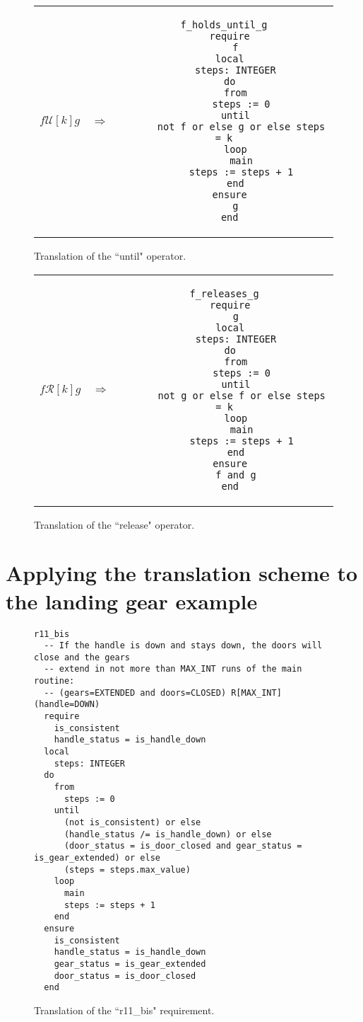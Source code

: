 \begin{figure}
\begin{tabular}{c c c}
$f \mathcal{U}[k] g$
&
$\Longrightarrow$
&
\begin{lstlisting}
f_holds_until_g
  require
    f
  local
    steps: INTEGER
  do
    from
      steps := 0
    until
      not f or else g or else steps = k
    loop
      main
      steps := steps + 1
    end
  ensure
    g
  end
\end{lstlisting}
\end{tabular}
\caption{Translation of the ``until" operator.}
\label{fig:ltl_until_eiffel}
\end{figure}

\begin{figure}
\begin{tabular}{c c c}
$f \mathcal{R}[k] g$
&
$\Longrightarrow$
&
\begin{lstlisting}
f_releases_g
  require
    g
  local
    steps: INTEGER
  do
    from
      steps := 0
    until
      not g or else f or else steps = k
    loop
      main
      steps := steps + 1
    end
  ensure
    f and g
  end
\end{lstlisting}
\end{tabular}
\caption{Translation of the ``release" operator.}
\label{fig:ltl_release_eiffel}
\end{figure}


\section{Applying the translation scheme to the landing gear example}
\label{sec:applying_to_example}

\begin{figure}
\begin{lstlisting}
r11_bis
  -- If the handle is down and stays down, the doors will close and the gears
  -- extend in not more than MAX_INT runs of the main routine:
  -- (gears=EXTENDED and doors=CLOSED) R[MAX_INT] (handle=DOWN)
  require
    is_consistent  
  	handle_status = is_handle_down
  local
    steps: INTEGER
  do
    from
      steps := 0
    until
      (not is_consistent) or else
      (handle_status /= is_handle_down) or else
      (door_status = is_door_closed and gear_status = is_gear_extended) or else
      (steps = steps.max_value)
    loop
      main
      steps := steps + 1
    end
  ensure
  	is_consistent  
    handle_status = is_handle_down
    gear_status = is_gear_extended
    door_status = is_door_closed
  end
\end{lstlisting}
\caption{Translation of the ``r11\_bis" requirement.}
\label{fig:r11_bis_translation}
\end{figure}


